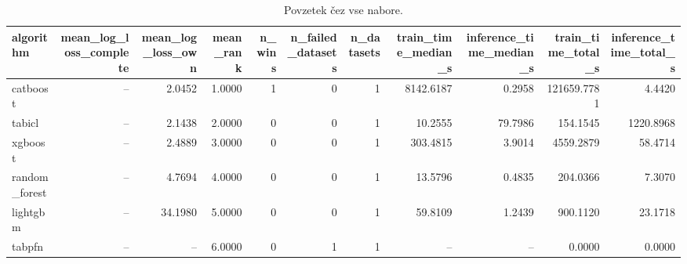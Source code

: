 \begin{table}[htbp]
\centering
\caption{Povzetek čez vse nabore.}
\label{tab:overall}
\begin{tabular}{lrrrrrrrrrr}
\hline
algorithm & mean\_log\_loss\_complete & mean\_log\_loss\_own & mean\_rank & n\_wins & n\_failed\_datasets & n\_datasets & train\_time\_median\_s & inference\_time\_median\_s & train\_time\_total\_s & inference\_time\_total\_s \\
\hline
catboost & -- & 2.0452 & 1.0000 & 1 & 0 & 1 & 8142.6187 & 0.2958 & 121659.7781 & 4.4420 \\
tabicl & -- & 2.1438 & 2.0000 & 0 & 0 & 1 & 10.2555 & 79.7986 & 154.1545 & 1220.8968 \\
xgboost & -- & 2.4889 & 3.0000 & 0 & 0 & 1 & 303.4815 & 3.9014 & 4559.2879 & 58.4714 \\
random\_forest & -- & 4.7694 & 4.0000 & 0 & 0 & 1 & 13.5796 & 0.4835 & 204.0366 & 7.3070 \\
lightgbm & -- & 34.1980 & 5.0000 & 0 & 0 & 1 & 59.8109 & 1.2439 & 900.1120 & 23.1718 \\
tabpfn & -- & -- & 6.0000 & 0 & 1 & 1 & -- & -- & 0.0000 & 0.0000 \\
\hline
\end{tabular}
\end{table}

